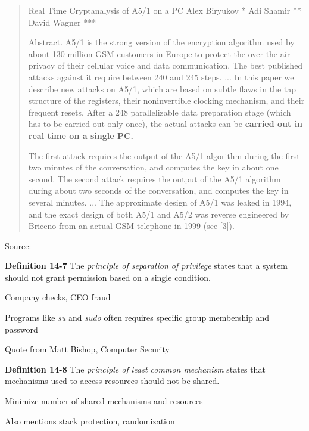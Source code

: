 \documentclass[Screen16to9,17pt]{foils}
\begin{document}
\begin{quote}
  Real Time Cryptanalysis of A5/1 on a PC
Alex Biryukov * Adi Shamir ** David Wagner ***

  Abstract. A5/1 is the strong version of the encryption algorithm used by about 130 million GSM customers in Europe to protect the over-the-air privacy of their cellular voice and data communication. The best published attacks against it require between 240 and 245 steps. ...
  In this paper we describe new attacks on A5/1, which are based on subtle flaws in the tap structure of the registers, their noninvertible clocking mechanism, and their frequent resets. After a 248 parallelizable data preparation stage (which has to be carried out only once), the actual attacks can be {\bf carried out in real time on a single PC.}

  The first attack requires the output of the A5/1 algorithm during the first two minutes of the conversation, and computes the key in about one second. The second attack requires the output of the A5/1 algorithm during about two seconds of the conversation, and computes the key in several minutes.
  ...
  The approximate design of A5/1 was leaked in 1994, and the exact design of both A5/1 and A5/2 was reverse engineered by Briceno from an actual GSM telephone in 1999 (see [3]).
\end{quote}
Source: 



\begin{list1}
\item {\bf Definition 14-7} The \emph{principle of separation of privilege} states that a system should not grant permission based on a single condition.
\item Company checks, CEO fraud
\item Programs like \emph{su} and \emph{sudo} often requires specific group membership and password
\end{list1}

Quote from Matt Bishop, Computer Security



\begin{list1}
\item {\bf Definition 14-8} The \emph{principle of least common mechanism} states that mechanisms used to access resources should not be shared.
\item Minimize number of shared mechanisms and resources
\item Also mentions stack protection, randomization
\end{list1}
\end{document}
